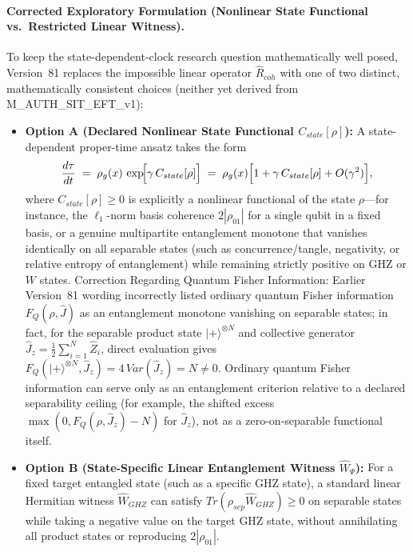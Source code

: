 \documentclass[american,11pt,letterpaper]{article}
\def\mathcal#1{#1}%
\def\mathrm#1{#1}%
\def\texttt#1{#1}%
\def\emph#1{#1}%
\begin{document}
\paragraph{Corrected Exploratory Formulation (Nonlinear State Functional vs.\ Restricted Linear Witness).}
To keep the state-dependent-clock research question mathematically well posed, Version~81 replaces the impossible linear operator $\hat{\mathcal{R}}_{\mathrm{coh}}$ with one of two distinct, mathematically consistent choices (neither yet derived from \texttt{M\_AUTH\_SIT\_EFT\_v1}):
\begin{itemize}
  \item \textbf{Option A (Declared Nonlinear State Functional $\mathcal{C}_{\mathrm{state}}[\rho]$):} A state-dependent proper-time ansatz takes the form
  \begin{equation}
  \frac{d\tau}{dt} \;=\; \rho_g(x)\,\exp\!\Bigl[\gamma\,\mathcal{C}_{\mathrm{state}}[\rho]\Bigr]
  \;=\; \rho_g(x)\Bigl[1 + \gamma\,\mathcal{C}_{\mathrm{state}}[\rho] + \mathcal{O}(\gamma^2)\Bigr],
  \label{eq:SIT3-master}
  \end{equation}
  where $\mathcal{C}_{\mathrm{state}}[\rho] \ge 0$ is explicitly a \emph{nonlinear} functional of the state $\rho$---for instance, the $\ell_1$-norm basis coherence $2|\rho_{01}|$ for a single qubit in a fixed basis, or a genuine multipartite entanglement monotone that vanishes identically on all separable states (such as concurrence/tangle, negativity, or relative entropy of entanglement) while remaining strictly positive on GHZ or $W$ states. \emph{Correction Regarding Quantum Fisher Information:} Earlier Version~81 wording incorrectly listed ordinary quantum Fisher information $F_Q(\rho, \hat{J})$ as an entanglement monotone vanishing on separable states; in fact, for the separable product state $|+\rangle^{\otimes N}$ and collective generator $\hat{J}_z = \frac{1}{2}\sum_{i=1}^N \hat{Z}_i$, direct evaluation gives $F_Q(|+\rangle^{\otimes N}, \hat{J}_z) = 4\,\mathrm{Var}(\hat{J}_z) = N \ne 0$. Ordinary quantum Fisher information can serve only as an entanglement criterion relative to a declared separability ceiling (for example, the shifted excess $\max(0, F_Q(\rho, \hat{J}_z) - N)$ for $\hat{J}_z$), not as a zero-on-separable functional itself.
  \item \textbf{Option B (State-Specific Linear Entanglement Witness $\hat{W}_{\Psi}$):} For a \emph{fixed} target entangled state (such as a specific GHZ state), a standard linear Hermitian witness $\hat{W}_{\mathrm{GHZ}}$ can satisfy $\mathrm{Tr}(\rho_{\mathrm{sep}}\hat{W}_{\mathrm{GHZ}}) \ge 0$ on separable states while taking a negative value on the target GHZ state, without annihilating all product states or reproducing $2|\rho_{01}|$.
\end{itemize}
\end{document}
